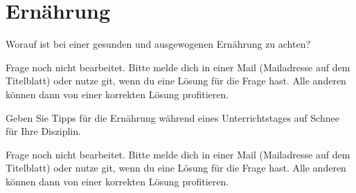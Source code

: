 \section{Ernährung}

\begin{question}{6}
    Worauf ist bei einer gesunden und ausgewogenen Ernährung zu achten?
\end{question}
\begin{solution}
    Frage noch nicht bearbeitet. Bitte melde dich in einer Mail (Mailadresse auf dem Titelblatt) oder nutze git, wenn du eine Lösung für die Frage hast. Alle anderen können dann von einer korrekten Lösung profitieren.
\end{solution}

\begin{question}{6}
    Geben Sie Tipps für die Ernährung während eines Unterrichtstages auf Schnee für Ihre Disziplin.
\end{question}
\begin{solution}
    Frage noch nicht bearbeitet. Bitte melde dich in einer Mail (Mailadresse auf dem Titelblatt) oder nutze git, wenn du eine Lösung für die Frage hast. Alle anderen können dann von einer korrekten Lösung profitieren.
\end{solution}

